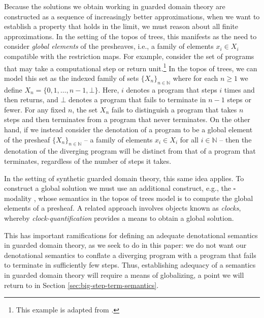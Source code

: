 Because the solutions we obtain working in guarded domain theory are constructed
as a sequence of increasingly better approximations, when we want to establish a
property that holds in the limit, we must reason about all finite
approximations. In the setting of the topos of trees, this manifests as the need
to consider \emph{global elements} of the presheaves, i.e., a family of elements
$x_i \in X_i$ compatible with the restriction maps. For example, consider the
set of programs that may take a computational step or return unit.\footnote{This example is adapted from \cite{mogelberg-paviotti2016}.} In the
topos of trees, we can model this set as the indexed family of sets $\{X_n\}_{n \in \mathbb{N}}$
where for each $n \ge 1$ we define $X_n = \{0,1,\dots,n-1, \bot\}$. Here, $i$ denotes a program that steps
$i$ times and then returns, and $\bot$ denotes a program that fails to terminate
in $n-1$ steps or fewer. For any fixed $n$, the set $X_n$ fails to distinguish a
program that takes $n$ steps and then terminates from a program that never
terminates. On the other hand, if we instead consider the denotation of a
program to be a global element of the presheaf $\{X_n\}_{n \in \mathbb{N}}$ -- a family of elements
$x_i \in X_i$ for all $i \in \mathbb{N}$ -- then the denotation of the diverging
program will be distinct from that of a program that terminates, regardless of
the number of steps it takes.

In the setting of synthetic guarded domain theory, this same idea applies. To
construct a global solution we must use an additional construct, e.g., the
$\square$ modality \cite{10.1007/978-3-319-08918-8_8}, whose semantics in the
topos of trees model is to compute the global elements of a presheaf. A related
approach involves objects known as \emph{clocks}, whereby
\emph{clock-quantification} \cite{atkey-mcbride2013} provides a means to obtain
a global solution.

This has important ramifications for defining an adequate denotational semantics
in guarded domain theory, as we seek to do in this paper: we do not want our
denotational semantics to conflate a diverging program with a program that fails
to terminate in sufficiently few steps. Thus, establishing adequacy of a
semantics in guarded domain theory will require a means of globalizing,
a point we will return to in Section \ref{sec:big-step-term-semantics}.



